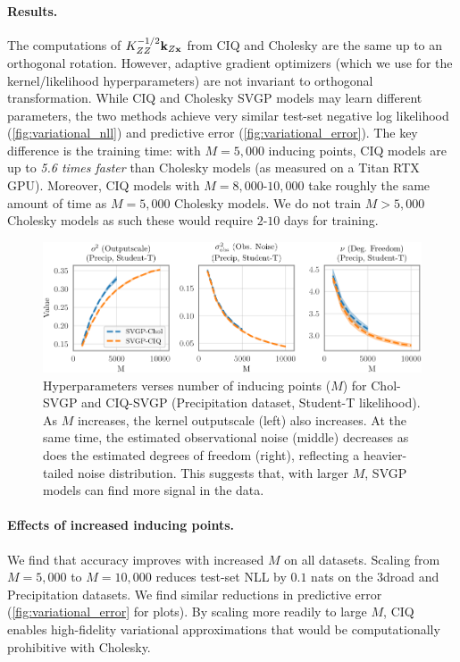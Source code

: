\paragraph{Results.}
The computations of $K_{ZZ}^{-1/2} \mathbf{k}_{Z\mathbf{x}}$ from CIQ and Cholesky are the same up to an orthogonal rotation.
However, adaptive gradient optimizers (which we use for the kernel/likelihood hyperparameters) are not invariant to orthogonal transformation.
While CIQ and Cholesky SVGP models may learn different parameters, the two methods achieve very similar test-set negative log likelihood (\cref{fig:variational_nll}) and predictive error (\cref{fig:variational_error}).
The key difference is the training time:
with $M=5,\!000$ inducing points, CIQ models are up to \emph{5.6 times faster} than Cholesky models (as measured on a Titan RTX GPU).
Moreover, CIQ models with $M=8,\!000$-$10,\!000$ take roughly the same amount of time as $M=5,\!000$ Cholesky models.
We do not train $M > 5,\!000$ Cholesky models as such these would require $2$-$10$ days for training.

\begin{figure}[t!]
  \centering
  \includegraphics[width=\linewidth]{figures/variational_stats.pdf}
  \caption[Train time comparison of Cholesky-whitened vs CIQ-whitened SVGP models.]{
    Hyperparameters verses number of inducing points ($M$) for Chol-SVGP and CIQ-SVGP (Precipitation dataset, Student-T likelihood).
    As $M$ increases, the kernel outputscale (left) also increases.
    At the same time, the estimated observational noise (middle) decreases as does the estimated degrees of freedom (right), reflecting a heavier-tailed noise distribution.
    This suggests that, with larger $M$, SVGP models can find more signal in the data.
  }
  \label{fig:variational_stats}
\end{figure}

\paragraph{Effects of increased inducing points.}
We find that accuracy improves with increased $M$ on all datasets.
Scaling from $M=5,\!000$ to $M=10,\!000$ reduces test-set NLL by $0.1$ nats on the 3droad and Precipitation datasets.
We find similar reductions in predictive error (\cref{fig:variational_error} for plots).
By scaling more readily to large $M$, CIQ enables high-fidelity variational approximations that would be computationally prohibitive with Cholesky.

